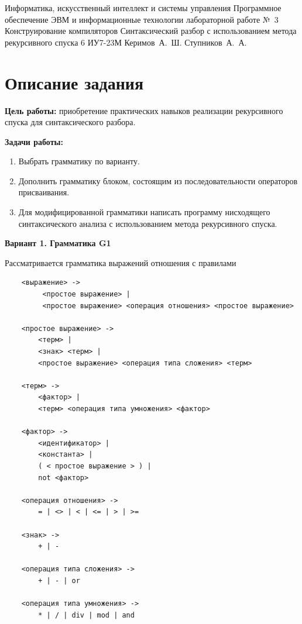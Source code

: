 \documentclass{bmstu-gost-7-32}
\begin{document}
\makereporttitle
	{Информатика, искусственный интеллект и системы управления} %
	{Программное обеспечение ЭВМ и информационные технологии} %
	{лабораторной работе №~3} %
	{Конструирование компиляторов} %
	{Синтаксический разбор с использованием метода рекурсивного спуска} %
	{6} %
	{ИУ7-23М} %
	{Керимов~А.~Ш.} %
	{Ступников~А.~А.} %

\section*{Описание задания}

\textbf{Цель работы:} приобретение практических навыков реализации рекурсивного спуска для синтаксического разбора.

\textbf{Задачи работы:}
\begin{enumerate}
	\item Выбрать грамматику по варианту.
	\item Дополнить грамматику блоком, состоящим из последовательности операторов присваивания.
	\item Для модифицированной грамматики написать программу нисходящего синтаксического анализа с использованием метода рекурсивного спуска.
\end{enumerate}

\textbf{Вариант 1. Грамматика G1}

Рассматривается грамматика выражений отношения с правилами

\begin{verbatim}
	<выражение> ->
	     <простое выражение> |
	     <простое выражение> <операция отношения> <простое выражение>

	<простое выражение> ->
	    <терм> |
	    <знак> <терм> |
	    <простое выражение> <операция типа сложения> <терм>

	<терм> ->
	    <фактор> |
	    <терм> <операция типа умножения> <фактор>

	<фактор> ->
	    <идентификатор> |
	    <константа> |
	    ( < простое выражение > ) |
	    not <фактор>

	<операция отношения> ->
	    = | <> | < | <= | > | >=

	<знак> ->
	    + | -

	<операция типа сложения> ->
	    + | - | or

	<операция типа умножения> ->
	    * | / | div | mod | and
\end{verbatim}
\end{document}
